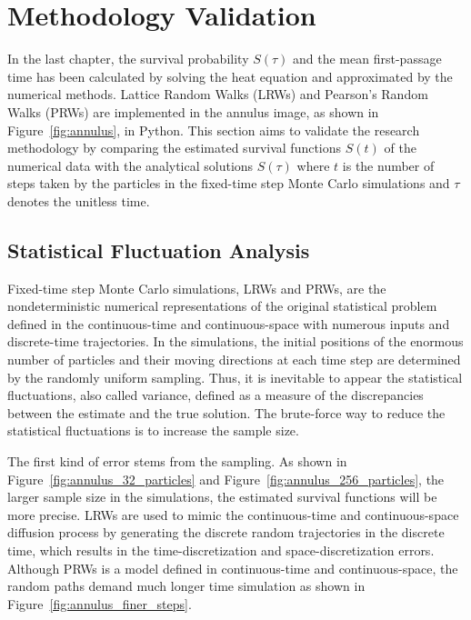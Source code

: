 \section{Methodology Validation}


In the last chapter, the survival probability $S(\tau)$ and the mean
first-passage time has been calculated by solving the heat equation
and approximated by the numerical methods. Lattice Random Walks (LRWs)
and Pearson's Random Walks (PRWs) are implemented in the annulus
image, as shown in Figure~\ref{fig:annulus}, in Python. This section
aims to validate the research methodology by comparing the estimated
survival functions $S(t)$ of the numerical data with the analytical
solutions $S(\tau)$ where $t$ is the number of steps taken by the
particles in the fixed-time step Monte Carlo simulations and $\tau$
denotes the unitless time.


\subsection{Statistical Fluctuation Analysis}

Fixed-time step Monte Carlo simulations, LRWs and PRWs, are the
nondeterministic numerical representations of the original statistical
problem defined in the continuous-time and continuous-space with
numerous inputs and discrete-time trajectories. In the simulations,
the initial positions of the enormous number of particles and their
moving directions at each time step are determined by the randomly
uniform sampling. Thus, it is inevitable to appear the statistical
fluctuations, also called variance, defined as a measure of the
discrepancies between the estimate and the true solution. The
brute-force way to reduce the statistical fluctuations is to increase
the sample size.


The first kind of error stems from the sampling. As shown in
Figure~\ref{fig:annulus_32_particles} and
Figure~\ref{fig:annulus_256_particles}, the larger sample size in the
simulations, the estimated survival functions will be more
precise. LRWs are used to mimic the continuous-time and
continuous-space diffusion process by generating the discrete random
trajectories in the discrete time, which results in the
time-discretization and space-discretization errors. Although PRWs is
a model defined in continuous-time and continuous-space, the random
paths demand much longer time simulation as shown in
Figure~\ref{fig:annulus_finer_steps}.

